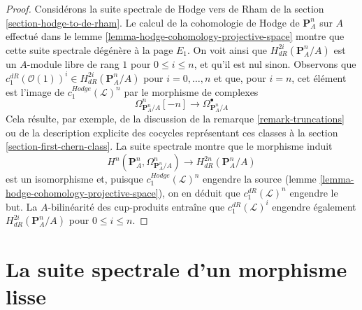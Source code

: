 \begin{proof}
Considérons la suite spectrale de Hodge vers de Rham de la
section \ref{section-hodge-to-de-rham}.
Le calcul de la cohomologie de Hodge de $\mathbf{P}^n_A$ sur $A$
effectué dans le lemme \ref{lemma-hodge-cohomology-projective-space}
montre que cette suite spectrale dégénère à la page $E_1$.
On voit ainsi que $H^{2i}_{dR}(\mathbf{P}^n_A/A)$ est un
$A$-module libre de rang $1$ pour $0 \leq i \leq n$, et qu'il est nul sinon.
Observons que $c_1^{dR}(\mathcal{O}(1))^i \in H^{2i}_{dR}(\mathbf{P}^n_A/A)$
pour $i = 0, \ldots, n$ et que, pour $i = n$, cet élément est
l'image de $c_1^{Hodge}(\mathcal{L})^n$ par le morphisme de complexes
$$
\Omega^n_{\mathbf{P}^n_A/A}[-n]
\longrightarrow
\Omega^\bullet_{\mathbf{P}^n_A/A}
$$
Cela résulte, par exemple, de la discussion de la remarque \ref{remark-truncations}
ou de la description explicite des cocycles représentant ces classes à la
section \ref{section-first-chern-class}.
La suite spectrale montre que le morphisme induit
$$
H^n(\mathbf{P}^n_A, \Omega^n_{\mathbf{P}^n_A/A}) \longrightarrow
H^{2n}_{dR}(\mathbf{P}^n_A/A)
$$
est un isomorphisme et, puisque $c_1^{Hodge}(\mathcal{L})^n$ engendre
la source (lemme \ref{lemma-hodge-cohomology-projective-space}),
on en déduit que $c_1^{dR}(\mathcal{L})^n$ engendre
le but. La $A$-bilinéarité des cup-produits
entraîne que $c_1^{dR}(\mathcal{L})^i$
engendre également $H^{2i}_{dR}(\mathbf{P}^n_A/A)$ pour
$0 \leq i \leq n$.
\end{proof}









\section{La suite spectrale d'un morphisme lisse}
\label{section-relative-spectral-sequence}

